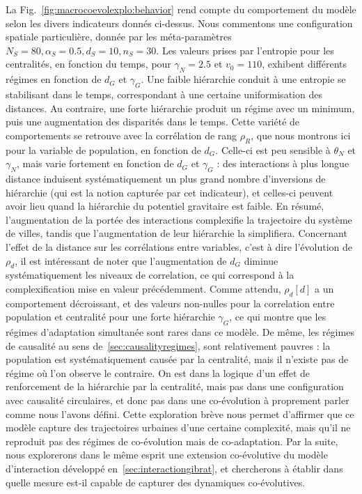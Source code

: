 La Fig.~\ref{fig:macrocoevolexplo:behavior} rend compte du comportement du modèle selon les divers indicateurs donnés ci-dessus. Nous commentons une configuration spatiale particulière, donnée par les méta-paramètres $N_S=80,\alpha_S=0.5,d_S=10,n_S=30$. Les valeurs prises par l'entropie pour les centralités, en fonction du temps, pour $\gamma_N = 2.5$ et $v_0 = 110$, exhibent différents régimes en fonction de $d_G$ et $\gamma_G$. Une faible hiérarchie conduit à une entropie se stabilisant dans le temps, correspondant à une certaine uniformisation des distances. Au contraire, une forte hiérarchie produit un régime avec un minimum, puis une augmentation des disparités dans le temps. Cette variété de comportements se retrouve avec la corrélation de rang $\rho_R$, que nous montrons ici pour la variable de population, en fonction de $d_G$. Celle-ci est peu sensible à $\theta_N$ et $\gamma_N$, mais varie fortement en fonction de $d_G$ et $\gamma_G$ : des interactions à plus longue distance induisent systématiquement un plus grand nombre d'inversions de hiérarchie (qui est la notion capturée par cet indicateur), et celles-ci peuvent avoir lieu quand la hiérarchie du potentiel gravitaire est faible. En résumé, l'augmentation de la portée des interactions complexifie la trajectoire du système de villes, tandis que l'augmentation de leur hiérarchie la simplifiera. Concernant l'effet de la distance sur les corrélations entre variables, c'est à dire l'évolution de $\rho_d$, il est intéressant de noter que l'augmentation de $d_G$ diminue systématiquement les niveaux de correlation, ce qui correspond à la complexification mise en valeur précédemment. Comme attendu, $\rho_d\left[d\right]$ a un comportement décroissant, et des valeurs non-nulles pour la correlation entre population et centralité pour une forte hiérarchie $\gamma_G$, ce qui montre que les régimes d'adaptation simultanée sont rares dans ce modèle. De même, les régimes de causalité au sens de~\ref{sec:causalityregimes}, sont relativement pauvres : la population est systématiquement causée par la centralité, mais il n'existe pas de régime où l'on observe le contraire. On est dans la logique d'un effet de renforcement de la hiérarchie par la centralité, mais pas dans une configuration avec causalité circulaires, et donc pas dans une co-évolution à proprement parler comme nous l'avons défini. Cette exploration brève nous permet d'affirmer que ce modèle capture des trajectoires urbaines d'une certaine complexité, mais qu'il ne reproduit pas des régimes de co-évolution mais de co-adaptation. Par la suite, nous explorerons dans le même esprit une extension co-évolutive du modèle d'interaction développé en~\ref{sec:interactiongibrat}, et chercherons à établir dans quelle mesure est-il capable de capturer des dynamiques co-évolutives.



